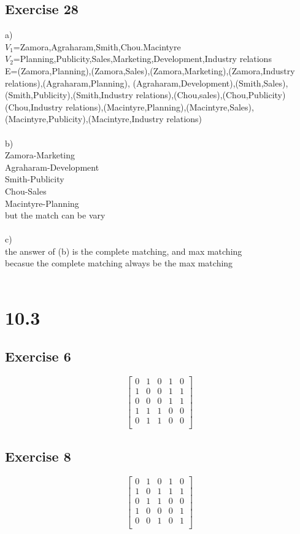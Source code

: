 \documentclass[12pt]{article}
\begin{document}
\subsection*{Exercise 28}
a)\\
$V_1$={Zamora,Agraharam,Smith,Chou.Macintyre}\\
$V_2$={Planning,Publicity,Sales,Marketing,Development,Industry relations}\\
E={(Zamora,Planning),(Zamora,Sales),(Zamora,Marketing),(Zamora,Industry relations),(Agraharam,Planning),
(Agraharam,Development),(Smith,Sales),(Smith,Publicity),(Smith,Industry relations),(Chou,sales),(Chou,Publicity)
(Chou,Industry relations),(Macintyre,Planning),(Macintyre,Sales),(Macintyre,Publicity),(Macintyre,Industry relations)}\\
\\
b)\\
Zamora-Marketing\\
Agraharam-Development\\
Smith-Publicity\\
Chou-Sales\\
Macintyre-Planning\\
but the match can be vary\\
\\
c)\\
the answer of (b) is the complete matching, and max matching\\
becasue the complete matching always be the max matching\\
\\
\section*{10.3}
\subsection*{Exercise 6}
$$
\left[
\begin{matrix}
    0 & 1 & 0 & 1 & 0\\
    1 & 0 & 0 & 1 & 1\\
    0 & 0 & 0 & 1 & 1\\
    1 & 1 & 1 & 0 & 0\\
    0 & 1 & 1 & 0 & 0\\
\end{matrix}
\right]
$$
\subsection*{Exercise 8}
$$
\left[
\begin{matrix}
    0 & 1 & 0 & 1 & 0\\
    1 & 0 & 1 & 1 & 1\\
    0 & 1 & 1 & 0 & 0\\
    1 & 0 & 0 & 0 & 1\\
    0 & 0 & 1 & 0 & 1\\
\end{matrix}
\right]
$$
\end{document}
